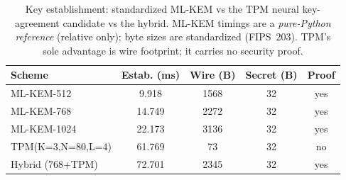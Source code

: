 \begin{table}[t]
\centering
\caption{Key establishment: standardized ML-KEM vs the TPM neural key-agreement candidate vs the hybrid. ML-KEM timings are a \emph{pure-Python reference} (relative only); byte sizes are standardized (FIPS~203). TPM's sole advantage is wire footprint; it carries no security proof.}
\label{tab:pqc}
\begin{tabular}{lcccc}
\toprule
Scheme & Estab. (ms) & Wire (B) & Secret (B) & Proof \\
\midrule
ML-KEM-512 & 9.918 & 1568 & 32 & yes \\
ML-KEM-768 & 14.749 & 2272 & 32 & yes \\
ML-KEM-1024 & 22.173 & 3136 & 32 & yes \\
TPM(K=3,N=80,L=4) & 61.769 & 73 & 32 & no \\
\midrule
Hybrid (768+TPM) & 72.701 & 2345 & 32 & yes \\
\bottomrule
\end{tabular}
\end{table}
